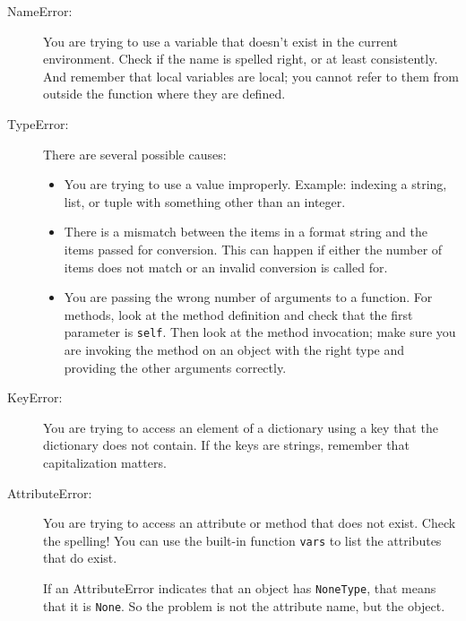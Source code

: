 \documentclass[10pt]{book}
\begin{document}
\begin{description}

\item[NameError:]  You are trying to use a variable that doesn't
exist in the current environment.  Check if the name
is spelled right, or at least consistently.
And remember that local variables are local; you
cannot refer to them from outside the function where they are defined.

\item[TypeError:] There are several possible causes:

\begin{itemize}

\item  You are trying to use a value improperly.  Example: indexing
a string, list, or tuple with something other than an integer.

\item There is a mismatch between the items in a format string and
the items passed for conversion.  This can happen if either the number
of items does not match or an invalid conversion is called for.

\item You are passing the wrong number of arguments to a function.
For methods, look at the method definition and
check that the first parameter is {\tt self}.  Then look at the
method invocation; make sure you are invoking the method on an
object with the right type and providing the other arguments
correctly.

\end{itemize}

\item[KeyError:]  You are trying to access an element of a dictionary
using a key that the dictionary does not contain.  If the keys
are strings, remember that capitalization matters.

\item[AttributeError:] You are trying to access an attribute or method
  that does not exist.  Check the spelling!  You can use the built-in
  function {\tt vars} to list the attributes that do exist.

If an AttributeError indicates that an object has {\tt NoneType},
that means that it is {\tt None}.  So the problem is not the
attribute name, but the object.


\end{description}
\end{document}
